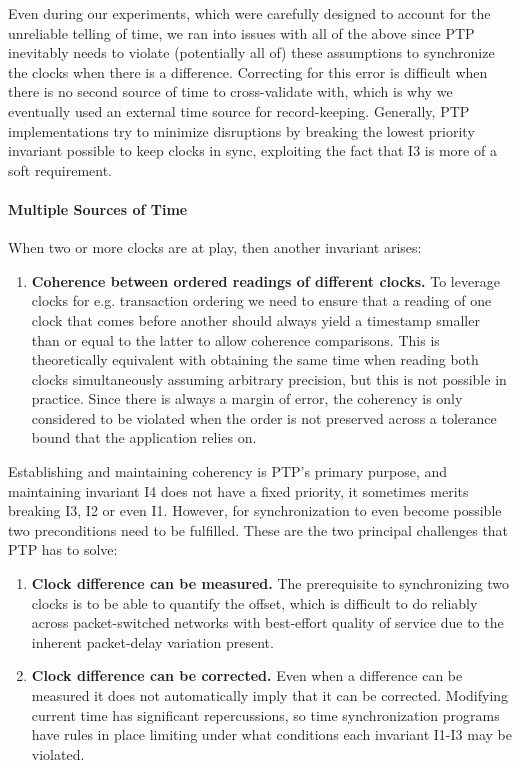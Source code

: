 Even during our experiments, which were carefully designed to account for the unreliable telling of time, we ran into issues with all of the above since PTP inevitably needs to violate (potentially all of) these assumptions to synchronize the clocks when there is a difference. Correcting for this error is difficult when there is no second source of time to cross-validate with, which is why we eventually used an external time source for record-keeping. Generally, PTP implementations try to minimize disruptions by breaking the lowest priority invariant possible to keep clocks in sync, exploiting the fact that I3 is more of a soft requirement.

\paragraph*{Multiple Sources of Time}

When two or more clocks are at play, then another invariant arises:

\begin{enumerate}[label=I\arabic*.]
    \setcounter{enumi}{\value{errorConditions}}
    \item \textbf{Coherence between ordered readings of different clocks.} To leverage clocks for e.g. transaction ordering we need to ensure that a reading of one clock that comes before another should always yield a timestamp smaller than or equal to the latter to allow coherence comparisons. This is theoretically equivalent with obtaining the same time when reading both clocks simultaneously assuming arbitrary precision, but this is not possible in practice. Since there is always a margin of error, the coherency is only considered to be violated when the order is not preserved across a tolerance bound that the application relies on.
\end{enumerate}

Establishing and maintaining coherency is PTP's primary purpose, and maintaining invariant I4 does not have a fixed priority, it sometimes merits breaking I3, I2 or even I1. However, for synchronization to even become possible two preconditions need to be fulfilled. These are the two principal challenges that PTP has to solve:

\begin{enumerate}[label=P\arabic*.]

    \item \textbf{Clock difference can be measured.} The prerequisite to synchronizing two clocks is to be able to quantify the offset, which is difficult to do reliably across packet-switched networks with best-effort quality of service due to the inherent packet-delay variation present.
    \item \textbf{Clock difference can be corrected.} Even when a difference can be measured it does not automatically imply that it can be corrected. Modifying current time has significant repercussions, so time synchronization programs have rules in place limiting under what conditions each invariant I1-I3 may be violated.
\end{enumerate}

